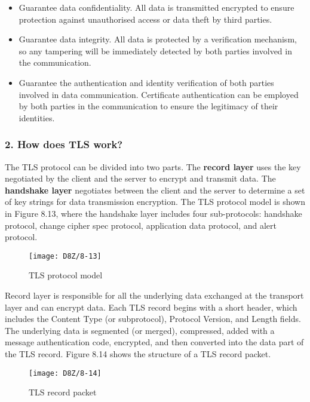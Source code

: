 \documentclass[a4paper,12pt]{book}
\begin{document}
\begin{itemize}[leftmargin=1.5em,noitemsep]
    \item Guarantee data confidentiality. All data is transmitted encrypted to ensure protection against unauthorised access or data theft by third parties.
    \item Guarantee data integrity. All data is protected by a verification mechanism, so any tampering will be immediately detected by both parties involved in the communication.
    \item Guarantee the authentication and identity verification of both parties involved in data communication. Certificate authentication can be employed by both parties in the communication to ensure the legitimacy of their identities.
\end{itemize}

\subsubsection{2. How does TLS work?}
The TLS protocol can be divided into two parts. The \textbf{record layer} uses the key negotiated by the client and the server to encrypt and transmit data. The \textbf{handshake layer} negotiates between the client and the server to determine a set of key strings for data transmission encryption. The TLS protocol model is shown in Figure 8.13, where the handshake layer includes four sub-protocols: handshake protocol, change cipher spec protocol, application data protocol, and alert protocol.

\begin{figure}[!h]
    \centering
    \texttt{[image: D8Z/8-13]}
    \caption{TLS protocol model}
\end{figure}

Record layer is responsible for all the underlying data exchanged at the transport layer and can encrypt data. Each TLS record begins with a short header, which includes the Content Type (or subprotocol), Protocol Version, and Length fields. The underlying data is segmented (or merged), compressed, added with a message authentication code, encrypted, and then converted into the data part of the TLS record. Figure 8.14 shows the structure of a TLS record packet.

\begin{figure}[!h]
    \centering
    \texttt{[image: D8Z/8-14]}
    \caption{TLS record packet}
\end{figure}
\end{document}
